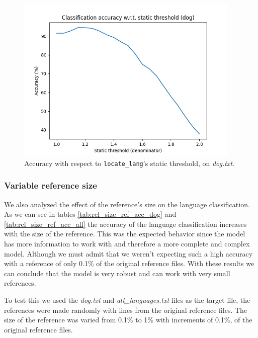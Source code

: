\documentclass{article}
\begin{document}
\begin{figure}
    \centering
    \includegraphics[width=0.95\textwidth]{../results/dog/ll-s.png}
    \caption{Accuracy with respect to \texttt{locate\_lang}'s static threshold, on \textit{dog.txt}.}
    \label{fig:ll_s_dog}
\end{figure}

\subsubsection{Variable reference size}
\label{subsubsec:results_locate_lang_variable_reference_size}

We also analyzed the effect of the reference's size on the language classification.
As we can see in tables \ref{tab:rel_size_ref_acc_dog} and \ref{tab:rel_size_ref_acc_all} the accuracy of the language classification increases with the size of the reference.
This was the expected behavior since the model has more information to work with and therefore a more complete and complex model.
Although we must admit that we weren't expecting such a high accuracy with a reference of only 0.1\% of the original reference files.
With these results we can conclude that the model is very robust and can work with very small references.

To test this we used the \textit{dog.txt} and \textit{all\_languages.txt} files as the target file, the references were made randomly with lines from the original 
reference files. The size of the reference was varied from 0.1\% to 1\% with increments of 0.1\%, of the original reference files.
\end{document}
